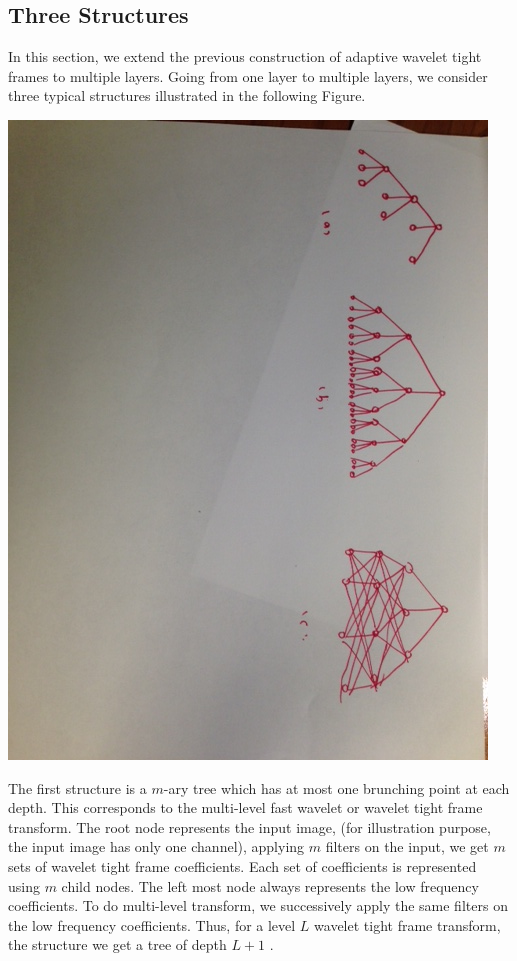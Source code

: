\documentclass[a4paper]{article}
\begin{document}
\subsection{Three Structures}
In this section, we extend the previous construction of adaptive wavelet tight frames to multiple layers. Going from one layer to multiple layers, we consider three typical structures illustrated in the following Figure.
\begin{center}
\includegraphics[scale=0.4]{arch.jpg}
\end{center}

The first structure is a $m$-ary tree which has at most one brunching point at each depth. This corresponds to the multi-level fast wavelet or wavelet tight frame transform. The root node represents the input image, (for illustration purpose, the input image has only one channel), applying $m$ filters on the input, we get $m$ sets of wavelet tight frame coefficients. Each set of coefficients is represented using $m$ child nodes. The left most node always represents the low frequency coefficients. To do multi-level transform, we successively apply the same filters on the low frequency coefficients. Thus, for a level $L$ wavelet tight frame transform, the structure we get a tree of depth $L+1$ . 
\end{document}
